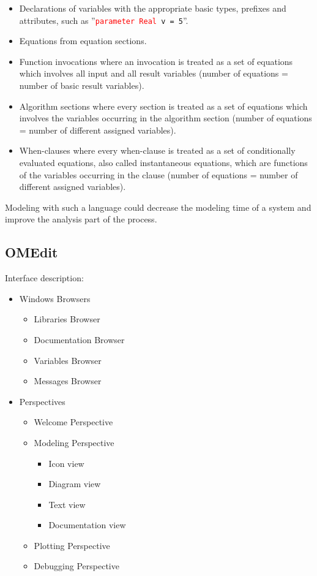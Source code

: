 \begin{itemize}
\itemsep 0em
\item Declarations of variables with the appropriate basic types, prefixes and attributes, such as ”\small{\texttt{\textcolor{red}{parameter} \textcolor{red}{Real} v = 5}}”.
\item Equations from equation sections.
\item Function invocations where an invocation is treated as a set of equations which involves all input and all result variables (number of equations = number of basic result variables).
\item Algorithm sections where every section is treated as a set of equations which involves the variables occurring in the algorithm section (number of equations = number of different assigned variables).
\item When-clauses where every when-clause is treated as a set of conditionally evaluated equations, also called instantaneous equations, which are functions of the variables occurring in the clause (number of equations = number of different assigned variables).
\end{itemize}

Modeling with such a language could decrease the modeling time of a system and improve the analysis part of the process. 

\subsection{OMEdit}
Interface description:
\begin{itemize}
\itemsep 0em
\item Windows Browsers
	\begin{itemize}
	\itemsep 0em
	\item Libraries Browser
	\item Documentation Browser
	\item Variables Browser
	\item Messages Browser
	\end{itemize}
\item Perspectives
	\begin{itemize}
	\itemsep 0em
	\item Welcome Perspective
	\item Modeling Perspective
		\begin{itemize}
		\itemsep 0em
		\item Icon view
		\item Diagram view
		\item Text view
		\item Documentation view
		\end{itemize}
	\item Plotting Perspective
	\item Debugging Perspective
	\end{itemize}
\end{itemize}

